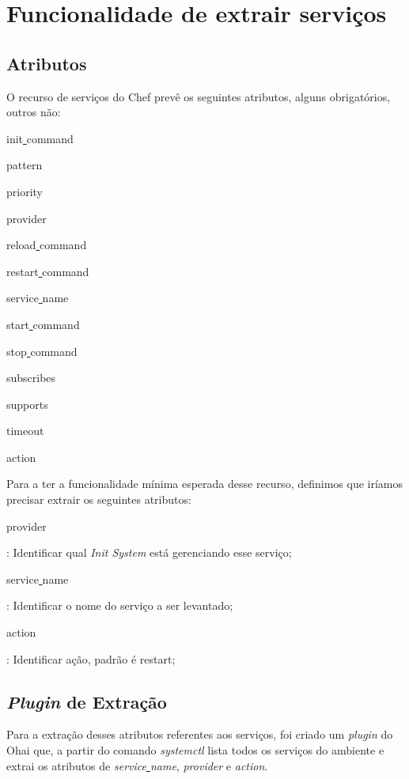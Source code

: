\section{Funcionalidade de extrair serviços}
\label{sec:services}

\subsection{Atributos}

O recurso de serviços do Chef prevê os seguintes atributos, alguns obrigatórios, outros não:

\begin{itemize}
{\itshape\item init\underline{ }command}
{\itshape\item pattern}
{\itshape\item priority}
{\itshape\item provider}
{\itshape\item reload\underline{ }command}
{\itshape\item restart\underline{ }command}
{\itshape\item service\underline{ }name}
{\itshape\item start\underline{ }command}
{\itshape\item stop\underline{ }command}
{\itshape\item subscribes}
{\itshape\item supports}
{\itshape\item timeout}
{\itshape\item action}
\end{itemize}

Para a ter a funcionalidade mínima esperada desse recurso, definimos que iríamos precisar
extrair os seguintes atributos:


\begin{itemize}
    {\itshape\item provider}: Identificar qual \textit{Init System} está gerenciando
esse serviço;
    {\itshape\item service\underline{ }name}: Identificar o nome do serviço a
ser levantado;
    {\itshape\item action}: Identificar ação, padrão é restart;
\end{itemize}

\subsection{\textit{Plugin} de Extração}
Para a extração desses atributos referentes aos serviços, foi criado um \textit{plugin} do
Ohai que, a partir do comando \textit{systemctl} lista todos os serviços do ambiente
e extrai os atributos de \textit{service\underline{ }name}, \textit{provider}
e \textit{action}.

